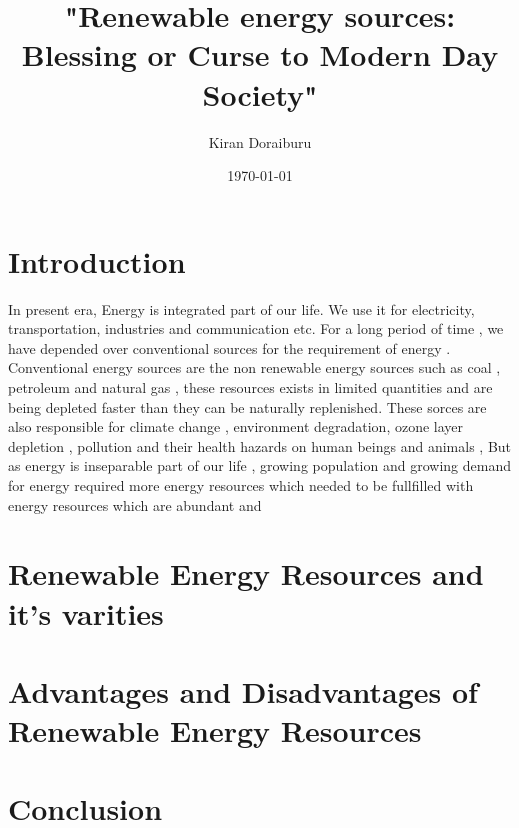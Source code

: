 \documentclass[two column]{article}
\title{"Renewable energy sources: Blessing or Curse to Modern Day Society"}
\author{Kiran Doraiburu}
\date{\today}
\begin{document}
\maketitle

\section{Introduction}
 In present era, Energy is integrated part of our life. We use it for electricity, transportation, industries and communication etc.  
For a long period of time , we have depended over conventional sources for the requirement of energy . Conventional energy sources are the non renewable energy sources such as coal , petroleum and natural gas , these resources exists in limited quantities and are being depleted faster than they can be naturally replenished. These sorces are also responsible for climate change , environment degradation, ozone layer depletion , pollution and their health hazards on human beings and animals , But as energy is inseparable part of our life , growing population and growing demand for energy required more energy resources which needed to be fullfilled with energy resources which are abundant and 

\section{Renewable Energy Resources and it's varities}
\section{Advantages and Disadvantages of Renewable Energy Resources}
\section{Conclusion}
\end{document}
